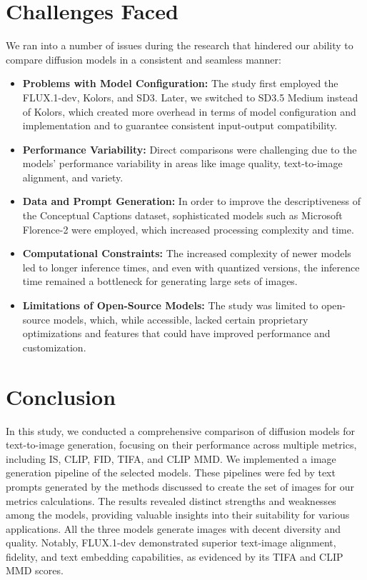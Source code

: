 \documentclass{article}
\begin{document}
\section{Challenges Faced}
We ran into a number of issues during the research that hindered our ability to compare diffusion models in a consistent and seamless manner:

\begin{itemize}
    \item \textbf{Problems with Model Configuration:} The study first employed the FLUX.1-dev, Kolors, and SD3. Later, we switched to SD3.5 Medium instead of Kolors, which created more overhead in terms of model configuration and implementation and to guarantee consistent input-output compatibility.
    
    \item \textbf{Performance Variability:} Direct comparisons were challenging due to the models’ performance variability in areas like image quality, text-to-image alignment, and variety.
    
    \item \textbf{Data and Prompt Generation:} In order to improve the descriptiveness of the Conceptual Captions dataset, sophisticated models such as Microsoft Florence-2 were employed, which increased processing complexity and time.
    
    \item \textbf{Computational Constraints:} The increased complexity of newer models led to longer inference times, and even with quantized versions, the inference time remained a bottleneck for generating large sets of images.
    
    \item \textbf{Limitations of Open-Source Models:} The study was limited to open-source models, which, while accessible, lacked certain proprietary optimizations and features that could have improved performance and customization.
\end{itemize}

\section{Conclusion}
In this study, we conducted a comprehensive comparison of diffusion models for text-to-image generation, focusing on their performance across multiple metrics, including IS, CLIP, FID, TIFA, and CLIP MMD. We implemented a image generation pipeline of the selected models. These pipelines were fed by text prompts generated by the methods discussed to create the set of images for our metrics calculations. The results revealed distinct strengths and weaknesses among the models, providing valuable insights into their suitability for various applications. All the three models generate images with decent diversity and quality. Notably, FLUX.1-dev demonstrated superior text-image alignment, fidelity, and text embedding capabilities, as evidenced by its TIFA and CLIP MMD scores. 
\end{document}
